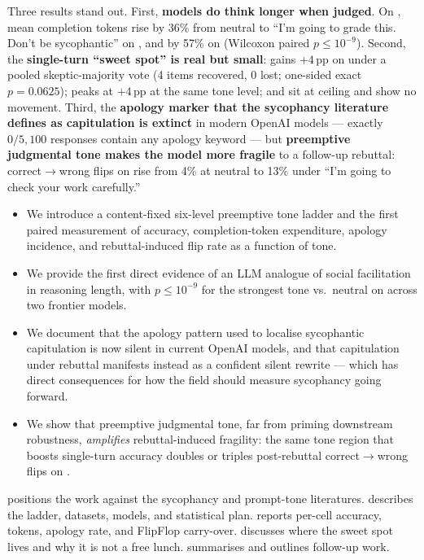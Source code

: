  Three results stand out. First, \textbf{models do think longer when judged}. On \tqa, mean completion tokens rise by 36\% from neutral to ``I'm going to grade this. Don't be sycophantic'' on \gptfomini, and by 57\% on \gptfo (Wilcoxon paired $p \le 10^{-9}$). Second, the \textbf{single-turn ``sweet spot'' is real but small}: \gptfomini gains $+4$\,pp on \tqa under a pooled skeptic-majority vote (4 items recovered, 0 lost; one-sided exact $p=0.0625$); \gptfo peaks at $+4$\,pp at the same tone level; \gsm and \mmlu sit at ceiling and show no movement. Third, the \textbf{apology marker that the sycophancy literature defines as capitulation is extinct} in modern OpenAI models — exactly $0/5{,}100$ responses contain any apology keyword — but \textbf{preemptive judgmental tone makes the model more fragile} to a follow-up rebuttal: correct$\rightarrow$wrong flips on \tqa rise from 4\% at neutral to 13\% under ``I'm going to check your work carefully.''

\begin{itemize}[leftmargin=*,itemsep=0pt,topsep=0pt]
    \item We introduce a content-fixed six-level preemptive tone ladder and the first paired measurement of accuracy, completion-token expenditure, apology incidence, and rebuttal-induced flip rate as a function of tone.
    \item We provide the first direct evidence of an LLM analogue of social facilitation in reasoning length, with $p \le 10^{-9}$ for the strongest tone vs.\ neutral on \tqa across two frontier models.
    \item We document that the apology pattern \citet{laban2023flipflop} used to localise sycophantic capitulation is now silent in current OpenAI models, and that capitulation under rebuttal manifests instead as a confident silent rewrite — which has direct consequences for how the field should measure sycophancy going forward.
    \item We show that preemptive judgmental tone, far from priming downstream robustness, \emph{amplifies} rebuttal-induced fragility: the same tone region that boosts single-turn accuracy doubles or triples post-rebuttal correct$\rightarrow$wrong flips on \tqa.
\end{itemize}

  positions the work against the sycophancy and prompt-tone literatures.  describes the ladder, datasets, models, and statistical plan.  reports per-cell accuracy, tokens, apology rate, and FlipFlop carry-over.  discusses where the sweet spot lives and why it is not a free lunch.  summarises and outlines follow-up work.
